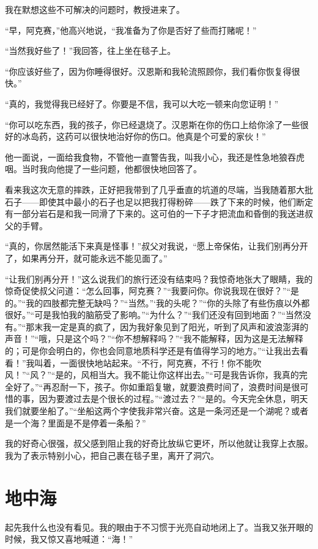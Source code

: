 \documentclass[10pt]{book}
\begin{document}
我在默想这些不可解决的问题时，教授进来了。

“早，阿克赛，”他高兴地说，“我准备为了你是否好了些而打赌呢！”

“当然我好些了！”我回答，往上坐在毯子上。

“你应该好些了，因为你睡得很好。汉恩斯和我轮流照顾你，我们看你恢复得很快。”

“真的，我觉得我已经好了。你要是不信，我可以大吃一顿来向您证明！”

“你可以吃东西，我的孩子，你已经退烧了。汉恩斯在你的伤口上给你涂了一些很好的冰岛药，这药可以很快地治好你的伤口。他真是个可爱的家伙！”

他一面说，一面给我食物，不管他一直警告我，叫我小心，我还是性急地狼吞虎咽。当时我向他提了一些问题，他都很快地回答了。

看来我这次无意的摔跌，正好把我带到了几乎垂直的坑道的尽端，当我随着那大批石子——即使其中最小的石子也足以把我打得粉碎——跌了下来的时候，他们断定有一部分岩石是和我一同滑了下来的。这可伯的一下子才把流血和昏倒的我送进叔父的手臂。

“真的，你居然能活下来真是怪事！”叔父对我说，“愿上帝保佑，让我们别再分开了，如果再分开，就可能永远不能见面了。”

“让我们别再分开！”这么说我们的旅行还没有结束吗？我惊奇地张大了眼睛，我的惊奇促使叔父问道：“怎么回事，阿克赛？”“我要问你。你说我现在很好？”“是的。”“我的四肢都完整无缺吗？”“当然。”‘我的头呢？”“你的头除了有些伤痕以外都很好。”“可是我怕我的脑筋受了影响。”“为什么？”“我们还没有回到地面？”“当然没有。”“那末我一定是真的疯了，因为我好象见到了阳光，听到了风声和波浪澎湃的声音！”“哦，只是这个吗？”“你不想解释吗？”“我不能解释，因为这是无法解释的；可是你会明白的，你也会同意地质科学还是有值得学习的地方。”“让我出去看看！”我叫着，一面很快地站起来。“不行，阿克赛，不行！你不能吹风！”“风？”“是的，风相当大。我不能让你这样出去。”“可是我告诉你，我真的完全好了。”“再忍耐一下，孩子。你如重蹈复辙，就要浪费时间了，浪费时间是很可惜的事，因为要渡过去是个很长的过程。”“渡过去？”“是的。今天完全休息，明天我们就要坐船了。”“坐船这两个字使我非常兴奋。这是一条河还是一个湖呢？或者是一个海？里面是不是停着一条船？”

我的好奇心很强，叔父感到阻止我的好奇比放纵它更坏，所以他就让我穿上衣服。我为了表示特别小心，把自己裹在毯子里，离开了洞穴。
\chapter{地中海}
起先我什么也没有看见。我的眼由于不习惯于光亮自动地闭上了。当我又张开眼的时候，我又惊又喜地喊道：“海！”
\end{document}

